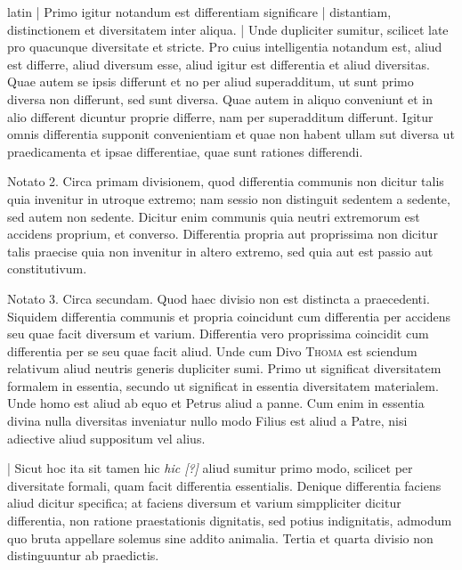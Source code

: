 \begin{otherlanguage*}{latin}
\pstart
\noindent%
\textnormal{|} Primo igitur notandum est differentiam significare \textnormal{|} distantiam, distinctionem et diversitatem inter aliqua. \textnormal{|} Unde dupliciter sumitur, scilicet late pro quacunque diversitate et stricte. Pro cuius intelligentia notandum est, aliud est differre, aliud diversum esse, aliud igitur est differentia et aliud diversitas. Quae autem se ipsis differunt et no per aliud superadditum, ut sunt primo diversa non differunt, sed sunt diversa. Quae autem in aliquo conveniunt et in alio different dicuntur proprie differre, nam per superadditum differunt. Igitur omnis differentia supponit convenientiam et quae non habent ullam sut diversa ut praedicamenta et ipsae differentiae, quae sunt rationes differendi. 
\pend

\pstart
Notato 2. Circa primam divisionem, quod differentia communis non dicitur talis quia invenitur in utroque extremo; nam sessio non distinguit sedentem a sedente, sed autem non sedente. Dicitur enim communis quia neutri extremorum est accidens proprium, et converso. Differentia propria aut proprissima non dicitur talis praecise quia non invenitur in altero extremo, sed quia aut est passio aut constitutivum. 
\pend

\pstart
Notato 3. Circa secundam. Quod haec divisio non est distincta a praecedenti. Siquidem differentia communis et propria coincidunt cum differentia per accidens seu quae facit diversum et varium. Differentia vero proprissima coincidit cum differentia per se seu quae facit aliud. Unde cum Divo \textsc{Thoma} est sciendum relativum aliud neutris generis dupliciter sumi. Primo ut significat diversitatem formalem in essentia, secundo ut significat in essentia diversitatem materialem. Unde homo est aliud ab equo et Petrus aliud a panne. Cum enim in essentia divina nulla diversitas inveniatur nullo modo Filius est aliud a Patre, nisi adiective aliud suppositum vel alius. 
\pend

\pstart
\textnormal{|} Sicut hoc ita sit tamen hic \emph{hic [?]} aliud sumitur primo modo, scilicet per diversitate formali, quam facit differentia essentialis. Denique differentia faciens aliud dicitur specifica; at faciens diversum et varium simppliciter dicitur differentia, non ratione praestationis dignitatis, sed potius indignitatis, admodum quo bruta appellare solemus sine addito animalia. Tertia et quarta divisio non distinguuntur ab praedictis. 
\pend


\end{otherlanguage*}
